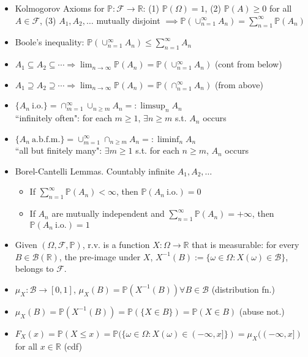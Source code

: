 \begin{itemize}
    \item Kolmogorov Axioms for $\mathbb{P}: \mathcal{F} \to \mathbb{R}$: (1) $\mathbb{P}(\Omega) = 1$, (2) $\mathbb{P}(A) \geq 0$ for all $A \in \mathcal{F}$, (3) $A_1, A_2, \dots$ mutually disjoint $\implies \mathbb{P}(\cup_{n=1}^\infty A_n) = \sum_{n=1}^\infty \mathbb{P}(A_n)$
    \item Boole's inequality: $\mathbb{P}(\cup_{n=1}^\infty A_n) \leq \sum_{n=1}^\infty A_n$
    \item $\displaystyle A_1 \subseteq A_2 \subseteq \cdots \Rightarrow \lim_{n\to\infty}\mathbb{P}(A_n) = \mathbb{P}(\cup_{n=1}^\infty A_n)$ (cont from below)
    \item $\displaystyle A_1 \supseteq A_2 \supseteq \cdots \Rightarrow \lim_{n\to\infty} \mathbb{P}(A_n) = \mathbb{P}(\cap_{n=1}^\infty A_n)$ (from above)
    \item $\displaystyle\{A_n \ \text{i.o.}\} = \cap_{m=1}^\infty \cup_{n\geq m} A_n =: \limsup_{n} A_n$ \\ ``infinitely often": for each $m \geq 1$, $\exists n \geq m$ s.t. $A_n$ occurs
    \item $\displaystyle\{A_n \ \text{a.b.f.m.}\} = \cup_{m=1}^\infty \cap_{n\geq m} A_n =: \liminf_n A_n$ \\ ``all but finitely many": $\exists m \geq 1$ s.t. for each $n \geq m$, $A_n$ occurs
    \item Borel-Cantelli Lemmas. Countably infinite $A_1, A_2, \dots$
    \begin{itemize}
        \item If $\sum_{n=1}^\infty \mathbb{P}(A_n) < \infty$, then $\mathbb{P}(A_n \ \text{i.o.}) = 0$
        \item If $A_n$ are mutually independent and $\sum_{n=1}^\infty \mathbb{P}(A_n) = +\infty$, then $\mathbb{P}(A_n \ \text{i.o.}) = 1$
    \end{itemize}
    \item Given $(\Omega, \mathcal{F}, \mathbb{P})$, r.v. is a function $X : \Omega \to \mathbb{R}$ that is measurable: for every $B \in \mathscr{B}(\mathbb{R})$, the pre-image under $X$, $X^{-1}(B) := \{\omega\in\Omega : X(\omega) \in \mathscr{B}\}$, belongs to $\mathcal{F}$.
    \item $\mu_X: \mathscr{B} \to [0,1]$, $\mu_X(B) = \mathbb{P}(X^{-1}(B)) \forall B \in \mathscr{B}$ (distribution fn.)
    \item $\mu_X(B) = \mathbb{P}(X^{-1}(B)) = \mathbb{P}(\{X \in B\}) = \mathbb{P}(X \in B)$ (abuse not.)
    \item $F_X(x) = \mathbb{P}(X \leq x) = \mathbb{P}(\{\omega\in\Omega : X(\omega) \in (-\infty, x]\}) = \mu_X((-\infty, x])$ for all $x \in \mathbb{R}$ (cdf)

\end{itemize}
